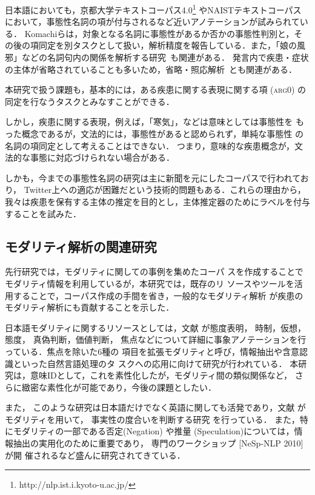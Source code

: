 \documentclass[japanese]{jnlp_1.4}
\begin{document}
日本語においても，京都大学テキストコーパス4.0\footnote{http://nlp.ist.i.kyoto-u.ac.jp/} やNAISTテキストコーパス
\cite{iida2010}において，事態性名詞の項が付与されるなど近いアノテーションが試みられている．
Komachiら\cite{komachi2007}は，対象となる名詞に事態性があるか否かの事態性判別と，その後の項同定を別タスクとして扱い，解析精度を報告している．また，「娘の風邪」などの名詞句内の関係を解析する研究~\cite{sasano2009}も関連がある．
発言内で疾患・症状の主体が省略されていることも多いため，省略・照応解析~\cite{sasano2008}とも関連がある．

本研究で扱う課題も，基本的には，ある疾患に関する表現に関する項 (\textsc{arg0}) の同定を行なうタスクとみなすことができる．

しかし，疾患に関する表現，例えば，「寒気」，などは意味としては事態性を
もった概念であるが，文法的には，事態性があると認められず，単純な事態性
の名詞の項同定として考えることはできない．
つまり，意味的な疾患概念が，文法的な事態に対応づけられない場合がある．

しかも，今までの事態性名詞の研究は主に新聞を元にしたコーパスで行われており，
Twitter上への適応が困難だという技術的問題もある．これらの理由から，我々は疾患を保有する主体の推定を目的とし，主体推定器のためにラベルを付与
することを試みた．


\subsection{モダリティ解析の関連研究}


先行研究\cite{aramaki-maskawa-morita:2011:EMNLP}では，モダリティに関しての事例を集めたコーパ
スを作成することでモダリティ情報を利用しているが，本研究では，既存のリ
ソースやツールを活用することで，コーパス作成の手間を省き，一般的なモダリティ解析
が疾患のモダリティ解析にも貢献することを示した．


日本語モダリティに関するリソースとしては，文献
\cite{matsuyoshi2010}が態度表明， 時制，仮想，態度， 真偽判断，価値判断，
焦点などについて詳細に事象アノテーションを行っている．焦点を除いた6種の
項目を拡張モダリティと呼び，情報抽出や含意認識といった自然言語処理のタ
スクへの応用に向けて研究が行われている．
本研究は，意味IDとして，これを素性化したが，モダリティ間の類似関係など，
さらに緻密な素性化が可能であり，今後の課題としたい．

また， このような研究は日本語だけでなく英語に関しても活発であり，文献
\cite{sauri2012you}がモダリティを用いて， 事実性の度合いを判断する研究
を行っている．
また，特にモダリティの一部である否定(Negation)
や推量 (Speculation)については，情報抽出の実用化のために重要であり，
専門のワークショップ [NeSp-NLP 2010] が開
催されるなど盛んに研究されてきている．
\end{document}
